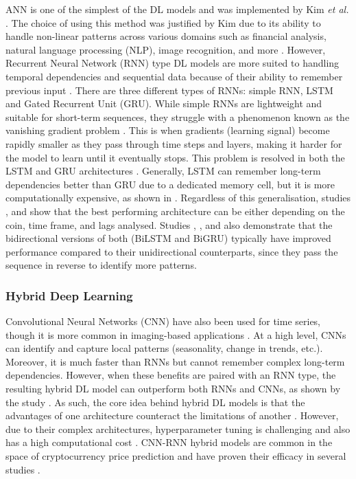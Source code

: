 \documentclass[ %
                    author={Raj Dhakan},
                supervisor={Dr. Ayush Joshi},
                    degree={MSc},
                     title={Ethereum Price Prediction using Internal and External Factors},
                  subtitle={},
                      type={},
                      year={2025}]{dissertation}
\begin{document}
ANN is one of the simplest of the DL models and was implemented by Kim \textit{et al.} \cite{RN141}. The choice of using this method was justified by Kim due to its ability to handle non-linear patterns across various domains such as financial analysis, natural language processing (NLP), image recognition, and more \cite{RN141}. However, Recurrent Neural Network (RNN) type DL models are more suited to handling temporal dependencies and sequential data because of their ability to remember previous input \cite{mazinani2025deep}. There are three different types of RNNs: simple RNN, LSTM and Gated Recurrent Unit (GRU). While simple RNNs are lightweight and suitable for short-term sequences, they struggle with a phenomenon known as the vanishing gradient problem \cite{mazinani2025deep}. This is when gradients (learning signal) become rapidly smaller as they pass through time steps and layers, making it harder for the model to learn until it eventually stops. This problem is resolved in both the LSTM and GRU architectures \cite{mazinani2025deep}. Generally, LSTM can remember long-term dependencies better than GRU due to a dedicated memory cell, but it is more computationally expensive, as shown in \cite{hansun2022multivariate}. Regardless of this generalisation, studies \cite{hansun2022multivariate}, \cite{seabe2023forecasting} and \cite{hamayel2021novel} show that the best performing architecture can be either depending on the coin, time frame, and lags analysed. Studies \cite{mazinani2025deep}, \cite{hansun2022multivariate}, and \cite{seabe2023forecasting} also demonstrate that the bidirectional versions of both (BiLSTM and BiGRU) typically have improved performance compared to their unidirectional counterparts, since they pass the sequence in reverse to identify more patterns.

\subsubsection{Hybrid Deep Learning}
Convolutional Neural Networks (CNN) have also been used for time series, though it is more common in imaging-based applications \cite{mazinani2025deep}. At a high level, CNNs can identify and capture local patterns (seasonality, change in trends, etc.). Moreover, it is much faster than RNNs but cannot remember complex long-term dependencies. However, when these benefits are paired with an RNN type, the resulting hybrid DL model can outperform both RNNs and CNNs, as shown by the study \cite{mazinani2025deep}. As such, the core idea behind hybrid DL models is that the advantages of one architecture counteract the limitations of another \cite{john2024cryptocurrency}. However, due to their complex architectures, hyperparameter tuning is challenging and also has a high computational cost \cite{john2024cryptocurrency}. CNN-RNN hybrid models are common in the space of cryptocurrency price prediction and have proven their efficacy in several studies \cite{mazinani2025deep, RN97, yu2024comparative, kang2022cryptocurrency, hoa2025hybrid}.
\end{document}
